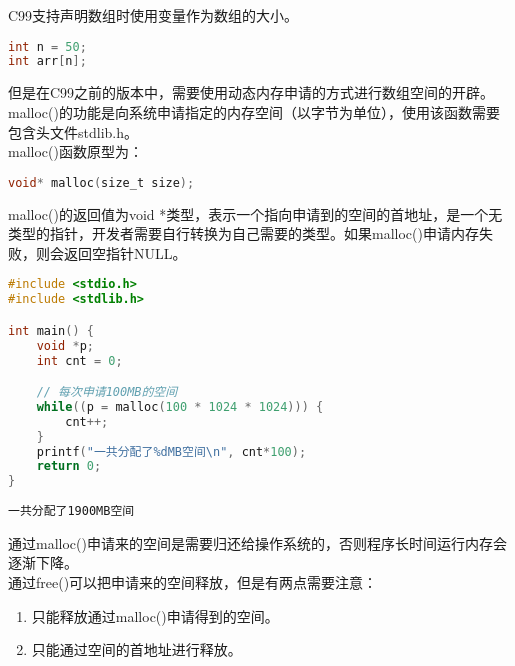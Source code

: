 C99支持声明数组时使用变量作为数组的大小。

\vspace{-0.5cm}

\begin{lstlisting}[language=C]
int n = 50;
int arr[n];
\end{lstlisting}

但是在C99之前的版本中，需要使用动态内存申请的方式进行数组空间的开辟。malloc()的功能是向系统申请指定的内存空间（以字节为单位），使用该函数需要包含头文件stdlib.h。\\

malloc()函数原型为：

\vspace{-0.5cm}

\begin{lstlisting}[language=C]
void* malloc(size_t size);
\end{lstlisting}

malloc()的返回值为void *类型，表示一个指向申请到的空间的首地址，是一个无类型的指针，开发者需要自行转换为自己需要的类型。如果malloc()申请内存失败，则会返回空指针NULL。\\


\begin{lstlisting}[language=C]
#include <stdio.h>
#include <stdlib.h>

int main() {
    void *p;
    int cnt = 0;

    // 每次申请100MB的空间
    while((p = malloc(100 * 1024 * 1024))) {
        cnt++;
    }
    printf("一共分配了%dMB空间\n", cnt*100);
    return 0;
}
\end{lstlisting}

\begin{tcolorbox}
    \begin{verbatim}
一共分配了1900MB空间
	\end{verbatim}
\end{tcolorbox}

通过malloc()申请来的空间是需要归还给操作系统的，否则程序长时间运行内存会逐渐下降。\\

通过free()可以把申请来的空间释放，但是有两点需要注意：

\begin{enumerate}
    \item 只能释放通过malloc()申请得到的空间。
    \item 只能通过空间的首地址进行释放。
\end{enumerate}

